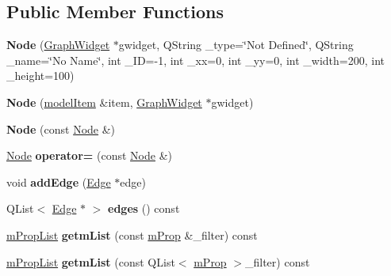 \subsection*{Public Member Functions}
\begin{DoxyCompactItemize}
\item 
\mbox{\label{class_node_a860d582568a195255427dc9063f92f0b}} 
{\bfseries Node} (\hyperlink{class_graph_widget}{Graph\+Widget} $\ast$gwidget, Q\+String \+\_\+type=\char`\"{}Not Defined\char`\"{}, Q\+String \+\_\+name=\char`\"{}No Name\char`\"{}, int \+\_\+\+ID=-\/1, int \+\_\+xx=0, int \+\_\+yy=0, int \+\_\+width=200, int \+\_\+height=100)
\item 
\mbox{\label{class_node_a1341bb2c32032a678a2b9d027886f8bd}} 
{\bfseries Node} (\hyperlink{classmodel_item}{model\+Item} \&item, \hyperlink{class_graph_widget}{Graph\+Widget} $\ast$gwidget)
\item 
\mbox{\label{class_node_a4053c6deca192c41824fad14c4f4eb76}} 
{\bfseries Node} (const \hyperlink{class_node}{Node} \&)
\item 
\mbox{\label{class_node_a3a9125b1ed10ea87bc2452fb668e6e07}} 
\hyperlink{class_node}{Node} {\bfseries operator=} (const \hyperlink{class_node}{Node} \&)
\item 
\mbox{\label{class_node_af761aaef36a761a90c4f148a6add914d}} 
void {\bfseries add\+Edge} (\hyperlink{class_edge}{Edge} $\ast$edge)
\item 
\mbox{\label{class_node_a770daa31ae9d7ed05c5f2ed7217f8d3a}} 
Q\+List$<$ \hyperlink{class_edge}{Edge} $\ast$ $>$ {\bfseries edges} () const
\item 
\mbox{\label{class_node_a2cd2bd34494ba5eea41f0e22136334bd}} 
\hyperlink{classm_prop_list}{m\+Prop\+List} {\bfseries getm\+List} (const \hyperlink{classm_prop}{m\+Prop} \&\+\_\+filter) const
\item 
\mbox{\label{class_node_ae27761ad8e4377b3a5fc1a381ce6a6a9}} 
\hyperlink{classm_prop_list}{m\+Prop\+List} {\bfseries getm\+List} (const Q\+List$<$ \hyperlink{classm_prop}{m\+Prop} $>$\+\_\+filter) const
\item 

\end{DoxyCompactItemize}

